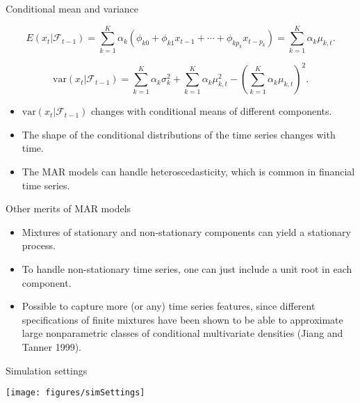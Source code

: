 \documentclass[12pt,ignorenonframetext,compress]{beamer}
\providecommand{\tightlist}{%
  \setlength{\itemsep}{0pt}\setlength{\parskip}{0pt}}
\begin{document}
\begin{frame}{Conditional mean and variance}
\protect\hypertarget{conditional-mean-and-variance}{}

\[E(x_t|\mathcal{F}_{t-1}) =
\sum\limits_{k=1}^K\alpha_k(\phi_{k0}+\phi_{k1}x_{t-1}+\cdots+\phi_{kp_k}x_{t-p
_k}) = \sum\limits_{k=1}^K\alpha_k \mu_{k, t}.\]

\[\mathrm{var}(x_t|\mathcal{F}_{t-1}) = \sum\limits_{k=1}^K\alpha_k \sigma_k^2 +
\sum\limits_{k=1}^K\alpha_k \mu_{k, t}^2 - \left(\sum\limits_{k=1}^K\alpha_k
\mu_{k, t}\right)^2.
\]

\begin{itemize}
\tightlist
\item
  \(\mathrm{var}(x_t|\mathcal{F}_{t-1})\) changes with conditional means
  of different components.
\item
  The shape of the conditional distributions of the time series changes
  with time.
\item
  The MAR models can handle heteroscedasticity, which is common in
  financial time series.
\end{itemize}

\end{frame}

\begin{frame}{Other merits of MAR models}
\protect\hypertarget{other-merits-of-mar-models}{}

\begin{itemize}
\tightlist
\item
  Mixtures of stationary and non-stationary components can yield a
  stationary process.
\item
  To handle non-stationary time series, one can just include a unit root
  in each component.
\item
  Possible to capture more (or any) time series features, since
  different specifications of finite mixtures have been shown to be able
  to approximate large nonparametric classes of conditional multivariate
  densities (Jiang and Tanner 1999).
\end{itemize}

\end{frame}

\begin{frame}{Simulation settings}
\protect\hypertarget{simulation-settings}{}

\centerline{\texttt{[image: figures/simSettings]}}

\end{frame}
\end{document}
